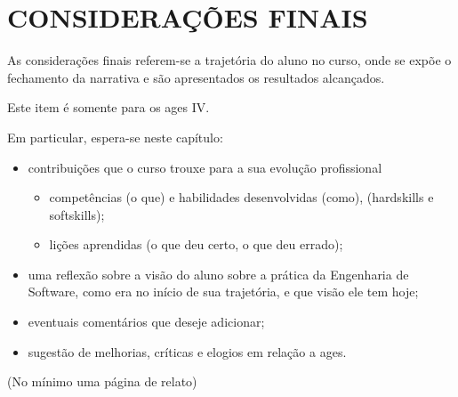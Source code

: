 \chapter[Considerações Finais]{CONSIDERAÇÕES FINAIS}

As considerações finais referem-se a trajetória do aluno no curso, onde se
expõe o fechamento da narrativa e são apresentados os resultados alcançados.

Este item é somente para os \ac{ages} IV.\

Em particular, espera-se neste capítulo:
\begin{itemize}
  \item{contribuições que o curso trouxe para a sua evolução profissional} 
  \begin{itemize}
    \item competências (o que) e habilidades desenvolvidas (como),
    (hardskills e softskills);
    \item lições aprendidas (o que deu certo, o que deu errado);
  \end{itemize}
  
  \item uma reflexão sobre a visão do aluno sobre a prática da Engenharia de
Software, como era no início de sua trajetória, e que visão ele tem hoje;
  
  \item eventuais comentários que deseje adicionar;
  
  \item sugestão de melhorias, críticas e elogios em relação a \ac{ages}.\
\end{itemize}

(No mínimo uma página de relato)